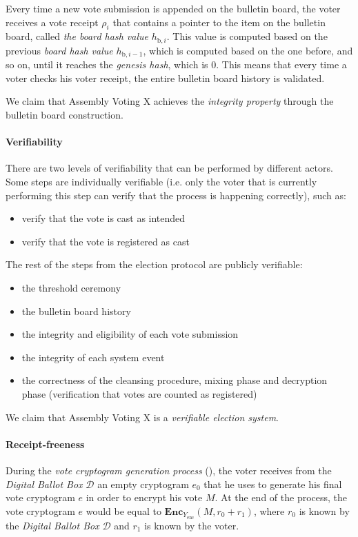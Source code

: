 Every time a new vote submission is appended on the bulletin board, the voter receives a vote receipt $\rho_i$ that contains a pointer to the item on the bulletin board, called \textit{the board hash value} $h_{\mathrm{b}, i}$. This value is computed based on the previous \textit{board hash value} $h_{\mathrm{b}, i-1}$, which is computed based on the one before, and so on, until it reaches the \textit{genesis hash}, which is 0. This means that every time a voter checks his voter receipt, the entire bulletin board history is validated.

We claim that Assembly Voting X achieves the \textit{integrity property} through the bulletin board construction.

\paragraph{Verifiability}
There are two levels of verifiability that can be performed by different actors. Some steps are individually verifiable (i.e. only the voter that is currently performing this step can verify that the process is happening correctly), such as:
\begin{itemize}
    \item verify that the vote is cast as intended
    \item verify that the vote is registered as cast
\end{itemize}
The rest of the steps from the election protocol are publicly verifiable:
\begin{itemize}
    \item the threshold ceremony
    \item the bulletin board history
    \item the integrity and eligibility of each vote submission
    \item the integrity of each system event
    \item the correctness of the cleansing procedure, mixing phase and decryption phase (verification that votes are counted as registered)
\end{itemize}

We claim that Assembly Voting X is a \textit{verifiable election system}.

\paragraph{Receipt-freeness}
During the \textit{vote cryptogram generation process} (), the voter receives from the \textit{Digital Ballot Box} $\mathcal{D}$ an empty cryptogram $e_0$ that he uses to generate his final vote cryptogram $e$ in order to encrypt his vote $M$. At the end of the process, the vote cryptogram $e$ would be equal to \( \mathbf{Enc}_{Y_\mathrm{enc}} (M, r_0 + r_1) \), where $r_0$ is known by the \textit{Digital Ballot Box} $\mathcal{D}$ and $r_1$ is known by the voter.

